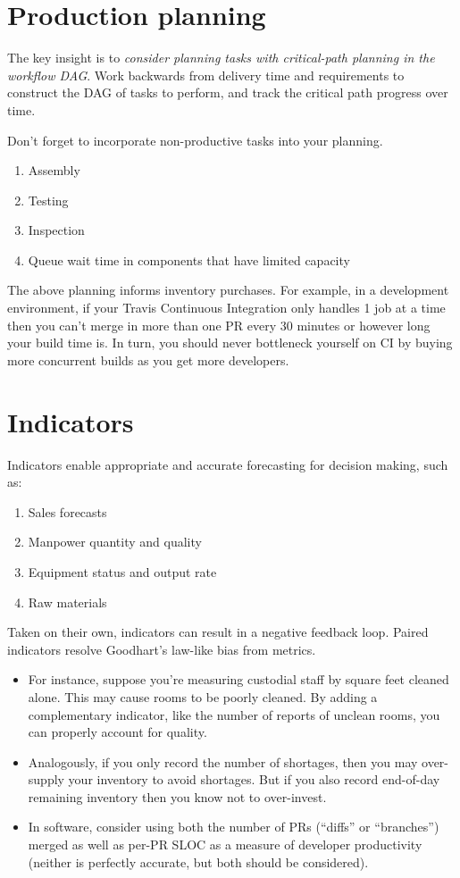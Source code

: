 \documentclass{article}
\begin{document}
\section{Production planning}

The key insight is to \textit{consider planning tasks with critical-path planning in the workflow DAG}. Work backwards from delivery time and requirements to construct the DAG of tasks to perform, and track the critical path progress over time.

Don’t forget to incorporate non-productive tasks into your planning.
\begin{enumerate}
\item Assembly
\item Testing
\item Inspection
\item Queue wait time in components that have limited capacity
\end{enumerate}

The above planning informs inventory purchases. For example, in a development environment, if your Travis Continuous Integration only handles 1 job at a time then you can’t merge in more than one PR every 30 minutes or however long your build time is. In turn, you should never bottleneck yourself on CI by buying more concurrent builds as you get more developers.

\section{Indicators}

Indicators enable appropriate and accurate forecasting for decision making, such as:

\begin{enumerate}
\item Sales forecasts
\item Manpower quantity and quality
\item Equipment status and output rate
\item Raw materials
\end{enumerate}

Taken on their own, indicators can result in a negative feedback loop. Paired indicators resolve Goodhart’s law-like bias from metrics. 

\begin{itemize}
\item For instance, suppose you’re measuring custodial staff by square feet cleaned alone. This may cause rooms to be poorly cleaned. By adding a complementary indicator, like the number of reports of unclean rooms, you can properly account for quality.
\item Analogously, if you only record the number of shortages, then you may over-supply your inventory to avoid shortages. But if you also record end-of-day remaining inventory then you know not to over-invest.
\item In software, consider using both the number of PRs (``diffs'' or ``branches'') merged as well as per-PR SLOC as a measure of developer productivity (neither is perfectly accurate, but both should be considered).
\end{itemize}
\end{document}
